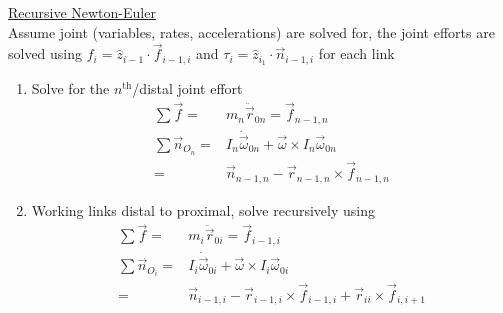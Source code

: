 \documentclass[twocolumn, 12pt]{article}    %
\begin{document}
\noindent\underline{Recursive Newton-Euler}\\
Assume joint (variables, rates, accelerations) are solved for, the joint efforts are solved using \(f_i = \hat{z}_{i-1} \cdot \vec{f}_{i-1,i}\) and \(\tau_i = \hat{z}_{i_1} \cdot \vec{n}_{i-1,i}\) for each link
\begin{enumerate}
    \item Solve for the \(n^{\text{th}}\)/distal joint effort
    \begin{align*}
        \sum \vec{f} =& m_n \ddot{\vec{r}}_{0n} = \vec{f}_{n-1,n}\\
        \sum \vec{n}_{O_n} =& I_n \dot{\vec{\omega}}_{0n} + \vec{\omega}\times I_n \vec{\omega}_{0n}\\
        =& \vec{n}_{n-1,n} - \vec{r}_{n-1,n} \times \vec{f}_{n-1,n} 
    \end{align*}
    \item Working links distal to proximal, solve recursively using
    \begin{align*}
        \sum \vec{f} =& m_i \ddot{\vec{r}}_{0i} = \vec{f}_{i-1,i}\\
        \sum \vec{n}_{O_i} =& I_i \dot{\vec{\omega}}_{0i} + \vec{\omega}\times I_i \vec{\omega}_{0i}\\
        =& \vec{n}_{i-1,i} - \vec{r}_{i-1,i} \times \vec{f}_{i-1,i} + \vec{r}_{ii} \times \vec{f}_{i,i+1} 
    \end{align*}
\end{enumerate}



\newpage
\end{document}
